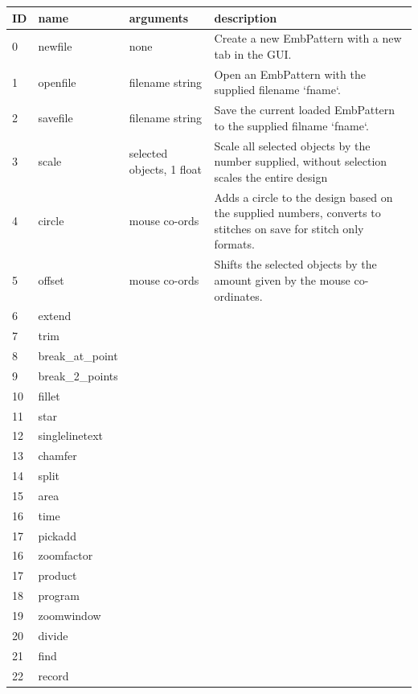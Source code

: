 \documentclass{report}
\begin{document}
\begin{longtable}{l l l p{3.5cm}}
\textbf{ID} & \textbf{name} & \textbf{arguments} & \textbf{description} \\
\hline
0 & \index{newfile}newfile & none & Create a new EmbPattern with a new tab in the GUI. \\
1 & \index{openfile}openfile & filename string & Open an EmbPattern with the supplied filename `fname`.  \\
2 & \index{savefile}savefile & filename string & Save the current loaded EmbPattern to the supplied filname `fname`. \\
3 & \index{scale}scale & selected objects, 1 float & Scale all selected objects by the number supplied, without selection scales the entire design \\
4 & \index{circle}circle & mouse co-ords & Adds a circle to the design based on the supplied numbers, converts to stitches on save for stitch only formats. \\
5 & \index{offset}offset & mouse co-ords & Shifts the selected objects by the amount given by the mouse co-ordinates.  \\
6 & \index{extend}extend & & \\
7 & \index{trim}trim & & \\
8 & \index{break-at-point}break\_at\_point & & \\
9 & \index{break-2-points}break\_2\_points & & \\
10 & \index{fillet}fillet & & \\
11 & \index{star}star & & \\
12 & \index{singlelinetext}singlelinetext & & \\
13 & \index{chamfer}chamfer & & \\
14 & \index{split}split & & \\
15 & \index{area}area & & \\
16 & \index{time}time & & \\
17 & \index{pickadd}pickadd & & \\
16 & \index{zoomfactor}zoomfactor & & \\
17 & \index{product}product & & \\
18 & \index{program}program & & \\
19 & \index{zoomwindow}zoomwindow & & \\
20 & \index{divide}divide & & \\
21 & \index{find}find & & \\
22 & \index{record}record & & \\

\end{longtable}
\end{document}
